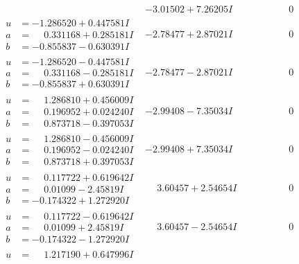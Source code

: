 \documentclass[1p]{elsarticle_modified}
\theoremstyle{definition}
\begin{document}
$$\begin{array}{c|c|c}
 & -3.01502 + 7.26205 I & \phantom{-0.000000 } 0 \\ \hline\begin{aligned}
u &= -1.286520 + 0.447581 I \\
a &= \phantom{-}0.331168 + 0.285181 I \\
b &= -0.855837 - 0.630391 I\end{aligned}
 & -2.78477 + 2.87021 I & \phantom{-0.000000 } 0 \\ \hline\begin{aligned}
u &= -1.286520 - 0.447581 I \\
a &= \phantom{-}0.331168 - 0.285181 I \\
b &= -0.855837 + 0.630391 I\end{aligned}
 & -2.78477 - 2.87021 I & \phantom{-0.000000 } 0 \\ \hline\begin{aligned}
u &= \phantom{-}1.286810 + 0.456009 I \\
a &= \phantom{-}0.196952 + 0.024240 I \\
b &= \phantom{-}0.873718 - 0.397053 I\end{aligned}
 & -2.99408 - 7.35034 I & \phantom{-0.000000 } 0 \\ \hline\begin{aligned}
u &= \phantom{-}1.286810 - 0.456009 I \\
a &= \phantom{-}0.196952 - 0.024240 I \\
b &= \phantom{-}0.873718 + 0.397053 I\end{aligned}
 & -2.99408 + 7.35034 I & \phantom{-0.000000 } 0 \\ \hline\begin{aligned}
u &= \phantom{-}0.117722 + 0.619642 I \\
a &= \phantom{-}0.01099 - 2.45819 I \\
b &= -0.174322 + 1.272920 I\end{aligned}
 & \phantom{-}3.60457 + 2.54654 I & \phantom{-0.000000 } 0 \\ \hline\begin{aligned}
u &= \phantom{-}0.117722 - 0.619642 I \\
a &= \phantom{-}0.01099 + 2.45819 I \\
b &= -0.174322 - 1.272920 I\end{aligned}
 & \phantom{-}3.60457 - 2.54654 I & \phantom{-0.000000 } 0 \\ \hline\begin{aligned}
u &= \phantom{-}1.217190 + 0.647996 I \\

\end{aligned}
\end{array}$$
\end{document}
